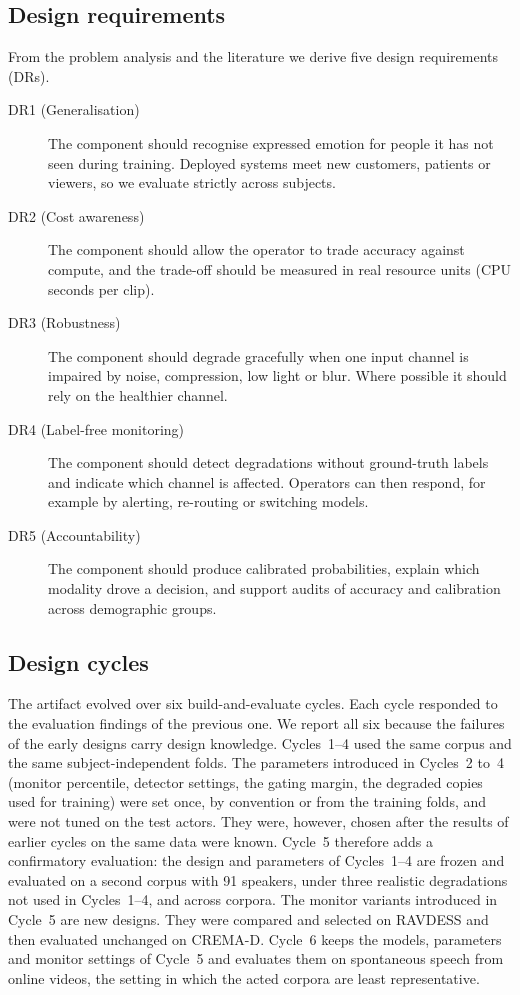 \subsection{Design requirements}

From the problem analysis and the literature we derive five design requirements (DRs).

\begin{description}
\item[DR1 (Generalisation)] The component should recognise expressed emotion for people it has not seen during training. Deployed systems meet new customers, patients or viewers, so we evaluate strictly across subjects.
\item[DR2 (Cost awareness)] The component should allow the operator to trade accuracy against compute, and the trade-off should be measured in real resource units (CPU seconds per clip).
\item[DR3 (Robustness)] The component should degrade gracefully when one input channel is impaired by noise, compression, low light or blur. Where possible it should rely on the healthier channel.
\item[DR4 (Label-free monitoring)] The component should detect degradations without ground-truth labels and indicate which channel is affected. Operators can then respond, for example by alerting, re-routing or switching models.
\item[DR5 (Accountability)] The component should produce calibrated probabilities, explain which modality drove a decision, and support audits of accuracy and calibration across demographic groups.
\end{description}

\subsection{Design cycles}

The artifact evolved over six build-and-evaluate cycles. Each cycle responded to the evaluation findings of the previous one. We report all six because the failures of the early designs carry design knowledge. Cycles~1--4 used the same corpus and the same subject-independent folds. The parameters introduced in Cycles~2 to~4 (monitor percentile, detector settings, the gating margin, the degraded copies used for training) were set once, by convention or from the training folds, and were not tuned on the test actors. They were, however, chosen after the results of earlier cycles on the same data were known. Cycle~5 therefore adds a confirmatory evaluation: the design and parameters of Cycles~1--4 are frozen and evaluated on a second corpus with 91 speakers, under three realistic degradations not used in Cycles~1--4, and across corpora. The monitor variants introduced in Cycle~5 are new designs. They were compared and selected on RAVDESS and then evaluated unchanged on CREMA-D. Cycle~6 keeps the models, parameters and monitor settings of Cycle~5 and evaluates them on spontaneous speech from online videos, the setting in which the acted corpora are least representative.

